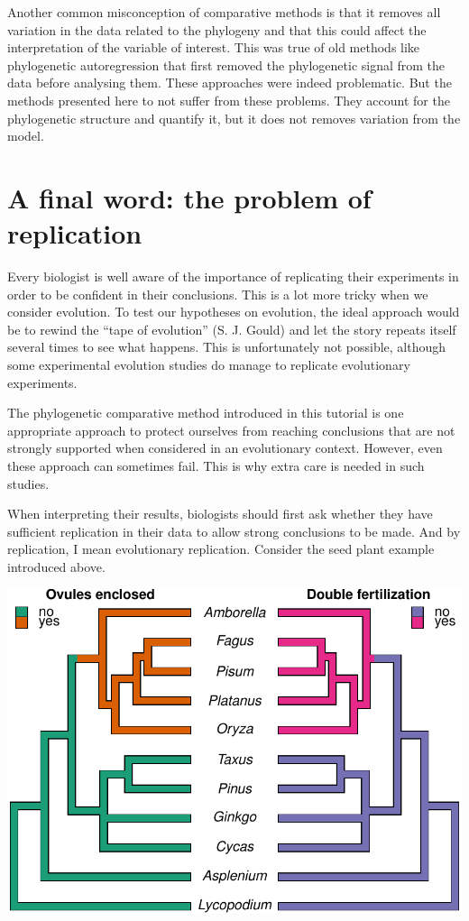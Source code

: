 \documentclass[
]{book}
\begin{document}
Another common misconception of comparative methods is that it removes all variation in the data related to the phylogeny and that this could affect the interpretation of the variable of interest. This was true of old methods like phylogenetic autoregression that first removed the phylogenetic signal from the data before analysing them. These approaches were indeed problematic. But the methods presented here to not suffer from these problems. They account for the phylogenetic structure and quantify it, but it does not removes variation from the model.

\chapter{A final word: the problem of replication}\label{a-final-word-the-problem-of-replication}

Every biologist is well aware of the importance of replicating their experiments in order to be confident in their conclusions. This is a lot more tricky when we consider evolution. To test our hypotheses on evolution, the ideal approach would be to rewind the ``tape of evolution'' (S. J. Gould) and let the story repeats itself several times to see what happens. This is unfortunately not possible, although some experimental evolution studies do manage to replicate evolutionary experiments.

The phylogenetic comparative method introduced in this tutorial is one appropriate approach to protect ourselves from reaching conclusions that are not strongly supported when considered in an evolutionary context. However, even these approach can sometimes fail. This is why extra care is needed in such studies.

When interpreting their results, biologists should first ask whether they have sufficient replication in their data to allow strong conclusions to be made. And by replication, I mean evolutionary replication. Consider the seed plant example introduced above.

\begin{center}\includegraphics{pcm-workshop_files/figure-latex/AngiospermsWithCharacters4-1} \end{center}
\end{document}
